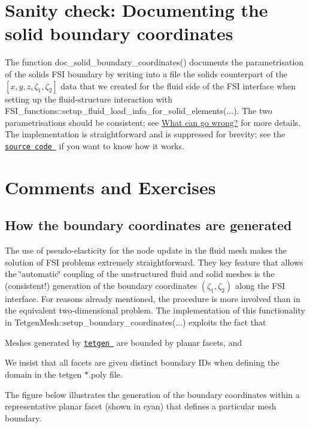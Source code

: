  

\hypertarget{index_doc_solid_zeta}{}\section{Sanity check\+: Documenting the solid boundary coordinates}\label{index_doc_solid_zeta}
The function {\ttfamily doc\+\_\+solid\+\_\+boundary\+\_\+coordinates()} documents the parametrisation of the solid\textquotesingle{}s F\+SI boundary by writing into a file the solid\textquotesingle{}s counterpart of the $ [ x, y, z, \zeta_1, \zeta_2 ] $ data that we created for the fluid side of the F\+SI interface when setting up the fluid-\/structure interaction with {\ttfamily F\+S\+I\+\_\+functions\+::setup\+\_\+fluid\+\_\+load\+\_\+info\+\_\+for\+\_\+solid\+\_\+elements}(...). The two parametrisations should be consistent; see \hyperlink{index_go_wrong}{What can go wrong?} for more details. The implementation is straightforward and is suppressed for brevity; see the \href{../../../../demo_drivers/interaction/unstructured_three_d_fsi/unstructured_three_d_fsi.cc}{\tt source code } if you want to know how it works.



 

\hypertarget{index_comm_ex}{}\section{Comments and Exercises}\label{index_comm_ex}
\hypertarget{index_boundary_coord}{}\subsection{How the boundary coordinates are generated}\label{index_boundary_coord}
The use of pseudo-\/elasticity for the node update in the fluid mesh makes the solution of F\+SI problems extremely straightforward. They key feature that allows the \char`\"{}automatic\char`\"{} coupling of the unstructured fluid and solid meshes is the (consistent!) generation of the boundary coordinates $ (\zeta_1,\zeta_2) $ along the F\+SI interface. For reasons already mentioned, the procedure is more involved than in the equivalent two-\/dimensional problem. The implementation of this functionality in {\ttfamily Tetgen\+Mesh\+::setup\+\_\+boundary\+\_\+coordinates}(...) exploits the fact that
\begin{DoxyEnumerate}
\item Meshes generated by \href{http://wias-berlin.de/software/tetgen//}{\tt {\ttfamily tetgen} } are bounded by planar facets, and ~\newline
~\newline

\item We insist that all facets are given distinct boundary I\+Ds when defining the domain in the tetgen {\ttfamily $\ast$.poly} file.
\end{DoxyEnumerate}The figure below illustrates the generation of the boundary coordinates within a representative planar facet (shown in cyan) that defines a particular mesh boundary.

